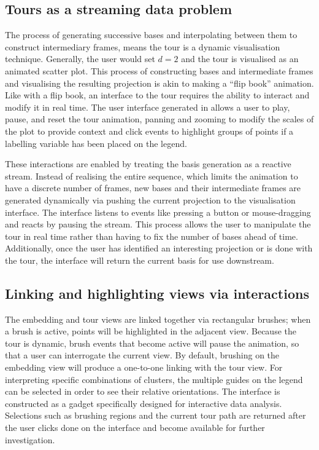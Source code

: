 \documentclass[article,notitle]{jdssv}
\begin{document}
\hypertarget{tours-as-a-streaming-data-problem}{%
\subsection{Tours as a streaming data problem}\label{tours-as-a-streaming-data-problem}}

The process of generating successive bases and interpolating between them to\\
construct intermediary frames, means the tour is a dynamic visualisation
technique. Generally, the user would set \(d=2\) and the tour is visualised as
an animated scatter plot. This process of constructing bases and intermediate
frames and visualising the resulting projection is akin to making a ``flip book''
animation. Like with a flip book, an interface to the tour requires the ability
to interact and modify it in real time. The user interface generated in 
allows a user to play, pause, and reset the tour animation,
panning and zooming to modify the scales of the plot to provide context and
click events to highlight groups of points if a labelling variable has
been placed on the legend.

These interactions are enabled by treating the basis generation as a reactive
stream. Instead of realising the entire sequence, which limits the animation
to have a discrete number of frames, new bases and their intermediate frames
are generated dynamically via pushing the current projection to the
visualisation interface. The interface listens to events like pressing a button
or mouse-dragging and reacts by pausing the stream. This process allows the
user to manipulate the tour in real time rather than having to fix the number
of bases ahead of time. Additionally, once the user has identified an
interesting projection or is done with the tour, the interface will return the
current basis for use downstream.

\hypertarget{linking-and-highlighting-views-via-interactions}{%
\subsection{Linking and highlighting views via interactions}\label{linking-and-highlighting-views-via-interactions}}

The embedding and tour views are linked together via rectangular brushes;
when a brush is active, points will be highlighted in the adjacent view.
Because the tour is dynamic, brush events that become active will pause the
animation, so that a user can interrogate the current view. By default,
brushing on the embedding view will produce a one-to-one linking with the tour
view. For interpreting specific combinations of clusters, the multiple
guides on the legend can be selected in order to see their relative orientations.
The interface is constructed as a  gadget specifically designed for
interactive data analysis. Selections such as brushing regions and the current
tour path are returned after the user clicks done on the interface and become
available for further investigation.
\end{document}
